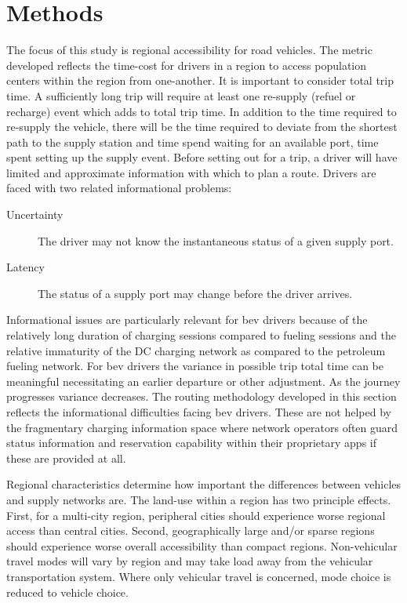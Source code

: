 \section*{Methods}

The focus of this study is regional accessibility for road vehicles. The metric developed reflects the time-cost for drivers in a region to access population centers within the region from one-another. It is important to consider total trip time. A sufficiently long trip will require at least one re-supply (refuel or recharge) event which adds to total trip time. In addition to the time required to re-supply the vehicle, there will be the time required to deviate from the shortest path to the supply station and  time spend waiting for an available port, time spent setting up the supply event. Before setting out for a trip, a driver will have limited and approximate information with which to plan a route. Drivers are faced with two related informational problems:

\begin{description}
	\item[Uncertainty] The driver may not know the instantaneous status of a given supply port.
	\item[Latency] The status of a supply port may change before the driver arrives.
\end{description}

Informational issues are particularly relevant for \gls{bev} drivers because of the relatively long duration of charging sessions compared to fueling sessions and the relative immaturity of the DC charging network as compared to the petroleum fueling network. For \gls{bev} drivers the variance in possible trip total time can be meaningful necessitating an earlier departure or other adjustment. As the journey progresses variance decreases. The routing methodology developed in this section reflects the informational difficulties facing \gls{bev} drivers. These are not helped by the fragmentary charging information space where network operators often guard status information and reservation capability within their proprietary apps if these are provided at all.

Regional characteristics determine how important the differences between vehicles and supply networks are. The land-use within a region has two principle effects. First, for a multi-city region, peripheral cities should experience worse regional access than central cities. Second, geographically large and/or sparse regions should experience worse overall accessibility than compact regions. Non-vehicular travel modes will vary by region and may take load away from the vehicular transportation system. Where only vehicular travel is concerned, mode choice is reduced to vehicle choice.

